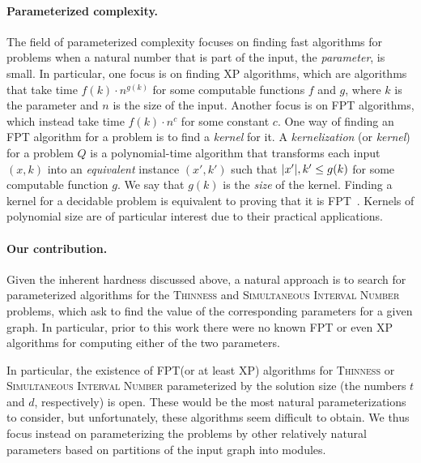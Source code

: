 \documentclass[11pt]{article}
\theoremstyle{plain}
\theoremstyle{definition}
\theoremstyle{remark}
\newcommand{\FPT}{{\smaller[0.83]\textsf{\textup{FPT}}}\xspace}
\newcommand{\XP}{{\smaller[0.83]\textsf{\textup{XP}}}\xspace}
\DeclarePairedDelimiter\abs{\lvert}{\rvert}
\begin{document}
\paragraph{Parameterized complexity.}
The field of parameterized complexity focuses on finding fast algorithms for problems when a natural number that is part of the input, the \emph{parameter}, is small. In particular, one focus is on finding \XP algorithms, which are algorithms that take time $f(k) \cdot n^{g(k)}$ for some computable functions $f$ and $g$, where $k$ is the parameter and $n$ is the size of the input. Another focus is on \FPT algorithms, which instead take time $f(k) \cdot n^c$ for some constant $c$. One way of finding an \FPT algorithm for a problem is to find a \emph{kernel} for it. A \emph{kernelization} (or \emph{kernel}) for a problem $Q$ is a polynomial-time algorithm that transforms each input $(x, k)$ into an \emph{equivalent} instance $(x', k')$ such that $\abs{x'}, k' \leq g(k)$ for some computable function $g$. We say that $g(k)$ is the \emph{size} of the kernel. Finding a kernel for a decidable problem is equivalent to proving that it is \FPT~\citep[Lemma 2.2]{parameterized-algorithms}. Kernels of polynomial size are of particular interest due to their practical applications.

\paragraph{Our contribution.} Given the inherent hardness discussed above, a natural approach is to search for parameterized algorithms for the \textsc{Thinness} and \textsc{Simultaneous Interval Number} problems, which ask to find the value of the corresponding parameters for a given graph. In particular, prior to this work there were no known \FPT or even \XP algorithms for computing either of the two parameters.

In particular, the existence of \FPT (or at least \XP) algorithms for \textsc{Thinness} or \textsc{Simultaneous Interval Number} parameterized by the solution size (the numbers $t$ and $d$, respectively) is open. These would be the most natural parameterizations to consider, but unfortunately, these algorithms seem difficult to obtain. We thus focus instead on parameterizing the problems by other relatively natural parameters based on partitions of the input graph into modules.
\end{document}
